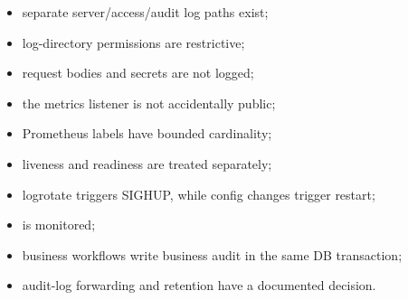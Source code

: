 \begin{itemize}
  \item separate server/access/audit log paths exist;
  \item log-directory permissions are restrictive;
  \item request bodies and secrets are not logged;
  \item the metrics listener is not accidentally public;
  \item Prometheus labels have bounded cardinality;
  \item liveness and readiness are treated separately;
  \item logrotate triggers SIGHUP, while config changes trigger restart;
  \item {} is monitored;
  \item business workflows write business audit in the same DB transaction;
  \item audit-log forwarding and retention have a documented decision.
\end{itemize}
